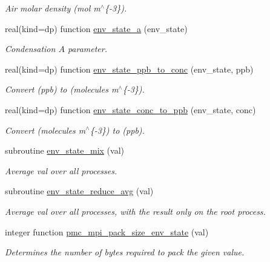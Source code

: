 \begin{DoxyCompactItemize}
\begin{DoxyCompactList}\small\item\em Air molar density (mol m$^\wedge$\{-\/3\}). \end{DoxyCompactList}\item 
real(kind=dp) function \mbox{\hyperlink{namespacepmc__env__state_a400b3cc0c7eeee1a0b88f59ea59a8568}{env\+\_\+state\+\_\+a}} (env\+\_\+state)
\begin{DoxyCompactList}\small\item\em Condensation $A$ parameter. \end{DoxyCompactList}\item 
real(kind=dp) function \mbox{\hyperlink{namespacepmc__env__state_a8069f202b6375dd2a08448f818673673}{env\+\_\+state\+\_\+ppb\+\_\+to\+\_\+conc}} (env\+\_\+state, ppb)
\begin{DoxyCompactList}\small\item\em Convert (ppb) to (molecules m$^\wedge$\{-\/3\}). \end{DoxyCompactList}\item 
real(kind=dp) function \mbox{\hyperlink{namespacepmc__env__state_ad49196e422e5bc68ec531a4804eef4f2}{env\+\_\+state\+\_\+conc\+\_\+to\+\_\+ppb}} (env\+\_\+state, conc)
\begin{DoxyCompactList}\small\item\em Convert (molecules m$^\wedge$\{-\/3\}) to (ppb). \end{DoxyCompactList}\item 
subroutine \mbox{\hyperlink{namespacepmc__env__state_afd588fc925707d56dbe301556e82dfc8}{env\+\_\+state\+\_\+mix}} (val)
\begin{DoxyCompactList}\small\item\em Average val over all processes. \end{DoxyCompactList}\item 
subroutine \mbox{\hyperlink{namespacepmc__env__state_aa3ca5b0885819b41abc09c607ee28e7f}{env\+\_\+state\+\_\+reduce\+\_\+avg}} (val)
\begin{DoxyCompactList}\small\item\em Average val over all processes, with the result only on the root process. \end{DoxyCompactList}\item 
integer function \mbox{\hyperlink{namespacepmc__env__state_ade49d8dfe1865485f6648200824a8aa2}{pmc\+\_\+mpi\+\_\+pack\+\_\+size\+\_\+env\+\_\+state}} (val)
\begin{DoxyCompactList}\small\item\em Determines the number of bytes required to pack the given value. \end{DoxyCompactList}\item 

\end{DoxyCompactItemize}
